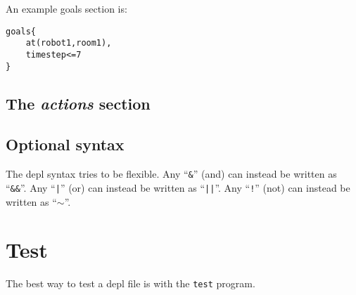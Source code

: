 \documentclass{article}
\begin{document}
An example goals section is:
\begin{verbatim}
goals{
    at(robot1,room1),
    timestep<=7
}
\end{verbatim}


\subsection{The \emph{actions} section}

\subsection{Optional syntax}

The depl syntax tries to be flexible.
Any
``\texttt{\&}''
(and) can instead be written as
``\texttt{\&\&}''.
Any
``\texttt{|}''
(or) can instead be written as
``\texttt{||}''.
Any
``\texttt{!}''
(not) can instead be written as
``$\sim$''.


\section{Test}
The best way to test a depl file is with the \verb|test| program.


\end{document}
